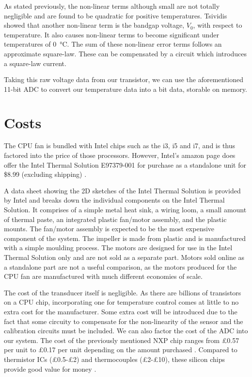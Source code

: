 \documentclass[conference]{IEEEtran}
\begin{document}
As stated previously, the non-linear terms although small are not totally negligible and are found to be quadratic for positive temperatures. Tsividis \cite{b8} \cite{b9} showed that another non-linear term is the bandgap voltage, $V_0$, with respect to temperature. It also causes non-linear terms to become significant under temperatures of \SI{0}{\celsius}. The sum of these non-linear error terms follows an approximate square-law. These can be compensated by a circuit which introduces a square-law current. 

Taking this raw voltage data from our transistor, we can use the aforementioned 11-bit ADC to convert our temperature data into a bit data, storable on memory. 
\section{Costs}
The CPU fan is bundled with Intel chips such as the i3, i5 and i7, and is thus factored into the price of those processors. However, Intel's amazon page does offer the Intel Thermal Solution E97379-001 for purchase as a standalone unit for \$8.99 (excluding shipping) \cite{b13}. 

A data sheet showing the 2D sketches of the Intel Thermal Solution is provided by Intel and breaks down the individual components on the Intel Thermal Solution. It comprises of a simple metal heat sink, a wiring loom, a small amount of thermal paste, an integrated plastic fan/motor assembly, and the plastic mounts. The fan/motor assembly is expected to be the most expensive component of the system. The impeller is made from plastic and is manufactured with a simple moulding process. The motors are designed for use in the Intel Thermal Solution only and are not sold as a separate part. Motors sold online as a standalone part are not a useful comparison, as the motors produced for the CPU fan are manufactured with much different economies of scale. 

The cost of the transducer itself is negligible. As there are billions of transistors on a CPU chip, incorporating one for temperature control comes at little to no extra cost for the manufacturer. Some extra cost will be introduced due to the fact that some circuity to compensate for the non-linearity of the sensor and the calibration circuits must be included. We can also factor the cost of the ADC into our system. The cost of the previously mentioned NXP chip ranges from £0.57 per unit to £0.17 per unit depending on the amount purchased \cite{b10}. Compared to thermistor ICs (£0.5-£2) and thermocouples (£2-£10), these silicon chips provide good value for money \cite{b11} \cite{b12}. 
\end{document}
